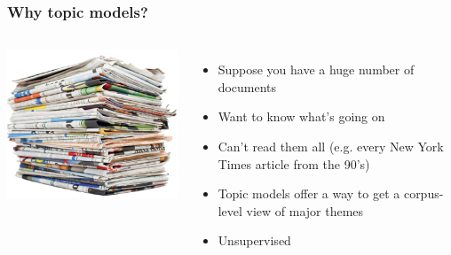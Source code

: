 

\providecommand{\graphscale}{0.6}


\newcommand{\dirfunc}[3]{ \frac{ \prod_{#1}^{#2} \g{ #3 } } { \g{ \sum_{#1}^{#2} #3 }}}
\newcommand{\dirnum}[4]{ \frac{\g{ #3 }}{#4} \prod_{#1}^{#2} }
\newcommand{\dirden}[3]{ \g{ \sum_{#1}^{#2} #3 } }



\begin{frame}

	\frametitle{Why topic models?}

	\begin{columns}


	\includegraphics[width=1\linewidth]{topic_models/newspapers}


	\begin{itemize}
		\item Suppose you have a huge number of documents
		\item Want to know what's going on
		\item Can't read them all (e.g. every New York Times article from the 90's)
		\item Topic models offer a way to get a corpus-level view of major themes
		\pause
		\item Unsupervised
	\end{itemize}


	\end{columns}

\end{frame}

